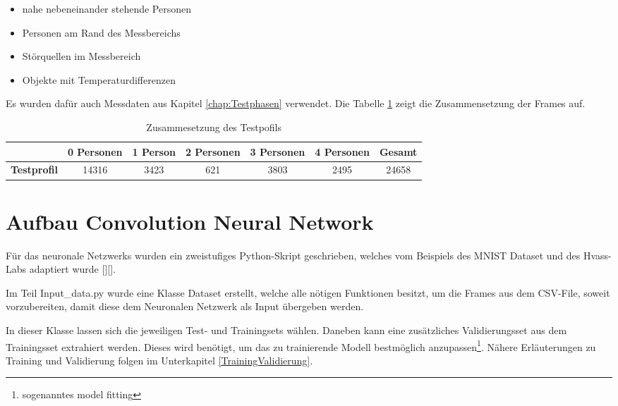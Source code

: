\begin{itemize}
	\item nahe nebeneinander stehende Personen 
	\item Personen am Rand des Messbereichs
	\item Störquellen im Messbereich
	\item Objekte mit Temperaturdifferenzen
\end{itemize}

Es wurden dafür auch Messdaten aus Kapitel \ref{chap:Testphasen} verwendet. Die Tabelle \ref{tab:Testprofil} zeigt die Zusammensetzung der Frames auf.

\begin{table}[H]
	\centering
	\caption{Zusammesetzung  des Testpofils}
	\label{tab:Testprofil}
	\begin{tabular}{|c|c|c|c|c|c|c|}
		\hline
		\rowcolor[HTML]{9B9B9B} 
		\multicolumn{1}{|l|}{\cellcolor[HTML]{9B9B9B}}                   & \multicolumn{1}{l|}{\cellcolor[HTML]{9B9B9B}\textbf{0 Personen}} & \textbf{1 Person} & \textbf{2 Personen} & \textbf{3 Personen} & \textbf{4 Personen} & \textbf{Gesamt} \\ \hline
		\cellcolor[HTML]{9B9B9B}\textbf{Testprofil}                         & 14316                                                          & 3423             & 621               & 3803                & 2495               & 24658          \\ \hline
	\end{tabular}
\end{table}

\section{Aufbau Convolution Neural Network}
\label{AufbauConv}

Für das neuronale Netzwerks wurden ein zweistufiges Python-Skript geschrieben, welches vom Beispiels des \ac{MNIST Dataset} und des Hvass-Labs adaptiert wurde [\protect\cite{Tensorflow}][\protect\cite{HVASS}].

Im Teil Input\_data.py wurde eine Klasse Dataset erstellt, welche alle nötigen Funktionen besitzt, um die Frames aus dem \ac{CSV}-File, soweit vorzubereiten, damit diese dem Neuronalen Netzwerk als Input übergeben werden. 

In dieser Klasse lassen sich die jeweiligen Test- und Trainingsets wählen. Daneben kann eine zusätzliches Validierungsset aus dem Trainingsset extrahiert werden. Dieses wird benötigt, um das zu trainierende Modell bestmöglich anzupassen\footnote{sogenanntes model fitting}. Nähere Erläuterungen zu Training und Validierung folgen im Unterkapitel \ref{TrainingValidierung}.

